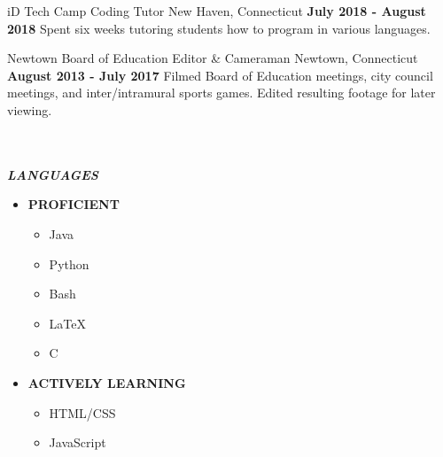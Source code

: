 \documentclass{awesome-cv}
\begin{document}
		\begin{cventries}
			\cventry
				{iD Tech Camp}
				{Coding Tutor}
				{New Haven, Connecticut}
                {\textbf{July 2018 - August 2018}}
				{Spent six weeks tutoring students how to program in various languages.}
				
			\cventry
				{Newtown Board of Education}
				{Editor \& Cameraman}
				{Newtown, Connecticut}
                {\textbf{August 2013 - July 2017}}
				{Filmed Board of Education meetings, city council meetings, and inter/intramural sports games. Edited resulting footage for later viewing.}
		\end{cventries}

	
	\vspace{0.5cm}
	\begin{multicols}{2}

		\\
			\\\textbf{\textit{LANGUAGES}}
			\begin{itemize}[nosep]

				\item \textbf{PROFICIENT}
					\begin{itemize}[nosep]
					\item Java
					\item Python
					\item Bash
					\item \LaTeX		
					\item C
				\end{itemize}

				\item \textbf{ACTIVELY LEARNING}
					\begin{itemize}[nosep]
					\item HTML/CSS
					\item JavaScript
				\end{itemize}
			\end{itemize}
				

\end{multicols}
\end{document}
